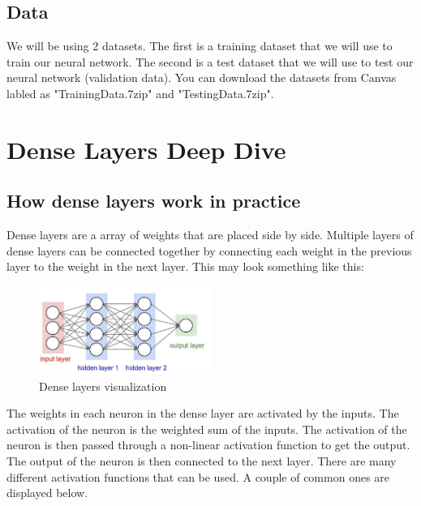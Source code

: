 \documentclass[11pt]{report}
\begin{document}
\section{Data}
We will be using 2 datasets. The first is a training dataset that we will use to train our neural network. The second is a test dataset that we will use to test our neural network (validation data). You can download the datasets from Canvas labled as "TrainingData.7zip" and "TestingData.7zip". 

\chapter{Dense Layers Deep Dive}
\section{How dense layers work in practice}
Dense layers are a array of weights that are placed side by side. Multiple layers of dense layers can be connected together by connecting each weight in the previous layer to the weight in the next layer. This may look something like this:


    \begin{figure}[h]
        \begin{center}
        \includegraphics[width=0.5\textwidth]{denselayers.jpeg}
        \caption{Dense layers visualization}
        \label{fig:dense_layers}
        \end{center}
    \end{figure}

The weights in each neuron in the dense layer are activated by the inputs. The activation of the neuron is the weighted sum of the inputs. The activation of the neuron is then passed through a non-linear activation function to get the output. The output of the neuron is then connected to the next layer. There are many different activation functions that can be used. A couple of common ones are displayed below.
 
\end{document}
